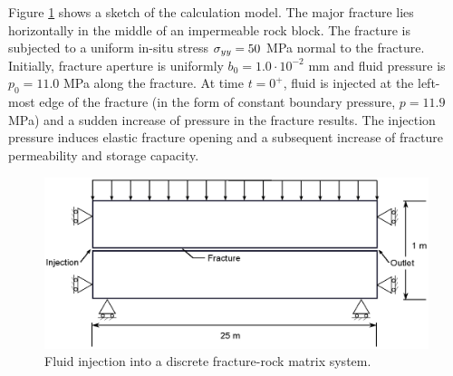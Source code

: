 Figure \ref{fig:ex_hm_single_problem} shows a sketch of the calculation model. The major fracture lies horizontally in the middle of an impermeable rock block.  
The fracture is subjected to a uniform in-situ stress $\sigma_{yy}=50$ MPa normal to the fracture. Initially, fracture aperture is uniformly $b_0 = 1.0 \cdot 10^{-2}$ mm and fluid pressure is $p_0=11.0$ MPa along the fracture. At time $t=0^+$, fluid is injected at the left-most edge of the fracture (in the form of constant boundary pressure, $p=11.9$ MPa) and a sudden increase of pressure in the fracture results.
%
The injection pressure induces elastic fracture opening and a subsequent increase of fracture permeability and storage capacity. 
%
\begin{figure}[!tbh]
\centering
\includegraphics[width=120mm]{chapter_14/figures/fig_14_4_26}
\caption{Fluid injection into a discrete fracture-rock matrix system.}
\label{fig:ex_hm_single_problem}
\end{figure}

